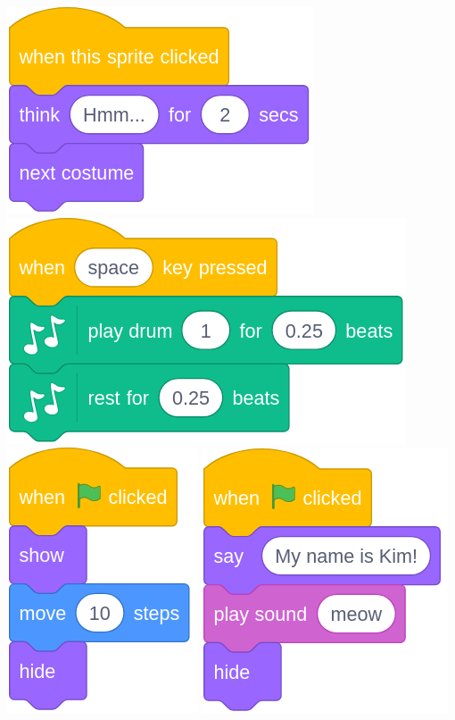\documentclass[letterpaper,12pt]{article}
\begin{document}
\includegraphics[scale=.3,valign=t]{q3_script0.png} \hspace{1cm}
\includegraphics[scale=.3,valign=t]{q3_script1.png} \hspace{1cm}
\includegraphics[scale=.3,valign=t]{q3_script2.png} \hspace{1cm}
\includegraphics[scale=.3,valign=t]{q3_script3.png} \hspace{1cm}
\end{document}
